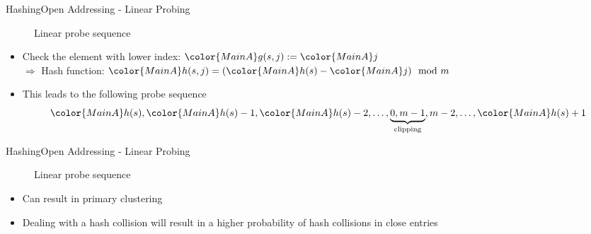 
\begin{frame}{Hashing}{Open Addressing - Linear Probing}
  \begin{figure}[!h]
    \begin{adjustbox}{width=0.75\linewidth}%
    \end{adjustbox}
    \vspace{-1.0em}
    \caption{Linear probe sequence}%
    \label{fig:hashing:open_addressing:linear_probing}%
  \end{figure}
  \vspace{-1.0em}
  \begin{itemize}
    \item<2->
      Check the element with lower index:
      \begin{math}
        {\color{MainA}g(s,j)} := {\color{MainA}j}
      \end{math}\\
      $\Rightarrow$ Hash function:
      \begin{math}
        {\color{MainA}h(s,j)}
        = ({\color{MainA}h(s)} - {\color{MainA}j}) \mod m
      \end{math}
    \item<3->
      This leads to the following probe sequence
      \begin{displaymath}
        {\color{MainA}h(s)},
        {\color{MainA}h(s)}-1,
        {\color{MainA}h(s)}-2,
        \dots,
        \underbrace{0, m-1}_\text{clipping},
        m-2,
        \dots,
        {\color{MainA}h(s)}+1
      \end{displaymath}
  \end{itemize}
\end{frame}


\begin{frame}{Hashing}{Open Addressing - Linear Probing}
  \begin{figure}[!h]
    \begin{adjustbox}{width=0.75\linewidth}%
    \end{adjustbox}
    \vspace{-0.5em}
    \caption{Linear probe sequence}%
    \label{fig:hashing:open_addressing:linear_probing2}%
  \end{figure}
  \vspace{-1.5em}
  \begin{itemize}
    \item<2->
      Can result in primary clustering
    \item<3->
      Dealing with a hash collision will result in a higher probability of hash
      collisions in close entries
  \end{itemize}
\end{frame}


